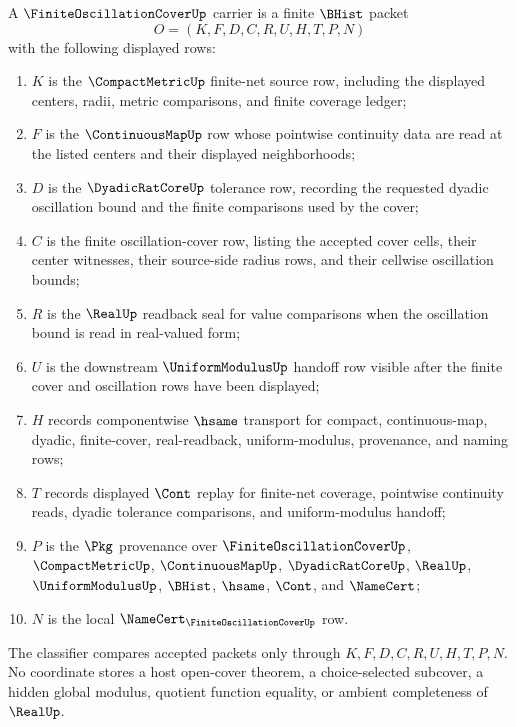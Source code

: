 \begin{definition}
\label{def:finite-oscillation-cover-carrier}
A $\FiniteOscillationCoverUp$ carrier is a finite $\BHist$ packet
$$
O=(K,F,D,C,R,U,H,T,P,N)
$$
with the following displayed rows:
\begin{enumerate}
\item $K$ is the $\CompactMetricUp$ finite-net source row, including the displayed centers, radii, metric comparisons, and finite coverage ledger;
\item $F$ is the $\ContinuousMapUp$ row whose pointwise continuity data are read at the listed centers and their displayed neighborhoods;
\item $D$ is the $\DyadicRatCoreUp$ tolerance row, recording the requested dyadic oscillation bound and the finite comparisons used by the cover;
\item $C$ is the finite oscillation-cover row, listing the accepted cover cells, their center witnesses, their source-side radius rows, and their cellwise oscillation bounds;
\item $R$ is the $\RealUp$ readback seal for value comparisons when the oscillation bound is read in real-valued form;
\item $U$ is the downstream $\UniformModulusUp$ handoff row visible after the finite cover and oscillation rows have been displayed;
\item $H$ records componentwise $\hsame$ transport for compact, continuous-map, dyadic, finite-cover, real-readback, uniform-modulus, provenance, and naming rows;
\item $T$ records displayed $\Cont$ replay for finite-net coverage, pointwise continuity reads, dyadic tolerance comparisons, and uniform-modulus handoff;
\item $P$ is the $\Pkg$ provenance over $\FiniteOscillationCoverUp$, $\CompactMetricUp$, $\ContinuousMapUp$, $\DyadicRatCoreUp$, $\RealUp$, $\UniformModulusUp$, $\BHist$, $\hsame$, $\Cont$, and $\NameCert$;
\item $N$ is the local $\NameCert_{\FiniteOscillationCoverUp}$ row.
\end{enumerate}
The classifier compares accepted packets only through $K,F,D,C,R,U,H,T,P,N$. No coordinate stores a host open-cover theorem, a choice-selected subcover, a hidden global modulus, quotient function equality, or ambient completeness of $\RealUp$.
\end{definition}

